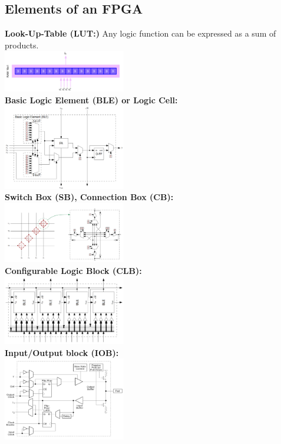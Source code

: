 	\subsection{Elements of an FPGA }
		\begin{multicols}{2}
			\textbf{Look-Up-Table (LUT:)} Any logic function can be expressed as a sum of products. \\
			\includegraphics[width=0.4\textwidth]{./pictures/LUT.png} \\
			\textbf{Basic Logic Element (BLE) or Logic Cell:} \\
			\includegraphics[width=0.4\textwidth]{./pictures/BLE.png} \\
			\textbf{Switch Box (SB), Connection Box (CB):} \\
			\includegraphics[width=0.4\textwidth]{./pictures/SB.png} \\
			\textbf{Configurable Logic Block (CLB):} \\
			\includegraphics[width=0.4\textwidth]{./pictures/CLB.png} \\ 		
			\textbf{Input/Output block (IOB):}  \\
			\includegraphics[width=0.4\textwidth]{./pictures/IOB.png} \\

\end{multicols}
